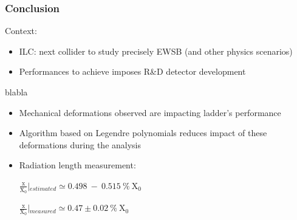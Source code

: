 \documentclass{beamer}
\begin{document}
\begin{frame}
  \frametitle{Conclusion}

  \begin{block}{Context:}
    \begin{itemize}
      \item ILC: next collider to study precisely EWSB (and other physics scenarios)
      \item Performances to achieve imposes R\&D detector development
    \end{itemize}
  \end{block}

  \begin{block}{blabla}
    \begin{itemize}
      \item Mechanical deformations observed are impacting ladder's performance
      \item Algorithm based on Legendre polynomials reduces impact of these deformations during the analysis
      \item Radiation length measurement: 
      \begin{center}
        $\frac{\text{x}}{\text{X}_0}\left|_{estimated} \simeq 0.498~-~0.515~\%~\text{X}_0 \right.$

        $\frac{\text{x}}{\text{X}_0}\left|_{measured} \simeq 0.47 \pm 0.02~\%~\text{X}_0 \right.$
      \end{center}
    \end{itemize}
  \end{block}



\end{frame}
\end{document}
